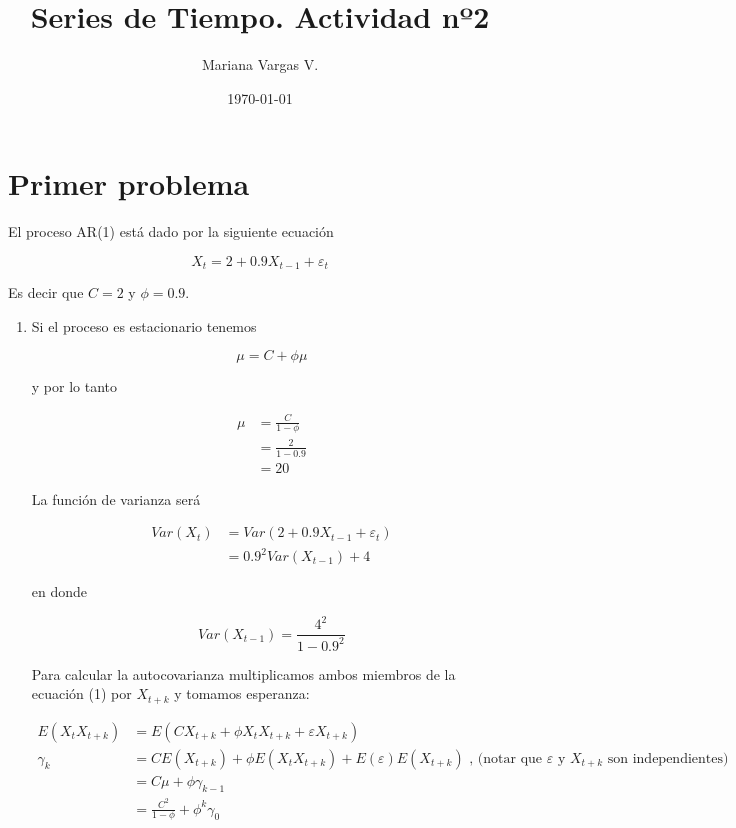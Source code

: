 \documentclass[a4paper,10pt]{article}
\title{Series de Tiempo. Actividad nº2}
\author{Mariana Vargas V.}
\date{\today}
\begin{document}
\maketitle

\section{Primer problema}

El proceso AR(1) está dado por la siguiente ecuación

\begin{equation}
 X_t = 2 + 0.9 X_{t-1} + \varepsilon_t
\end{equation}

Es decir que $C = 2$ y $\phi = 0.9$. 

\begin{enumerate}[label=(\alph*)]
 \item  Si el proceso es estacionario tenemos
 
 \begin{equation*}
  \mu = C + \phi \mu
 \end{equation*}

y por lo tanto

\begin{align*}
 \mu &= \frac{C}{1 - \phi}\\
 &= \frac{2}{1 - 0.9}\\
 &= 20
\end{align*}

La función de varianza será

\begin{align*}
 Var(X_t) &= Var(2 + 0.9X_{t-1} + \varepsilon_t)\\
 &= 0.9^2 Var(X_{t-1}) + 4
\end{align*}

en donde

\begin{equation*}
 Var(X_{t-1}) = \frac{4^2}{1 - 0.9^2}
\end{equation*}

Para calcular la autocovarianza multiplicamos ambos miembros de la ecuación (1) por $X_{t+k}$ y tomamos esperanza:

\begin{align*}
 E(X_t X_{t+k}) &= E(C X_{t+k} + \phi X_t X_{t+k} + \varepsilon X_{t+k}) \\
 \gamma_k &= C E(X_{t+k}) + \phi E(X_t X_{t+k}) + E(\varepsilon) E(X_{t+k}) \text{ , (notar que $\varepsilon$ y $X_{t+k}$ son independientes)} \\
 &= C \mu + \phi \gamma_{k-1} \\
 &= \frac{C^2}{1 - \phi} + \phi^k \gamma_0
\end{align*}



\end{enumerate}
\end{document}
